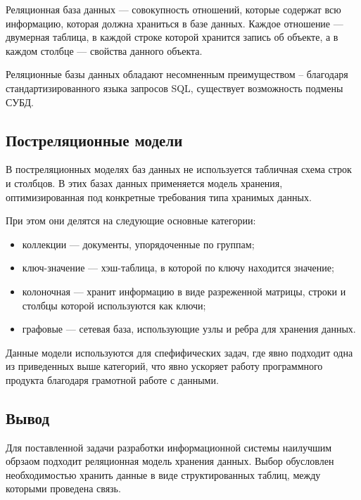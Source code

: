 Реляционная база данных \cite{db-sql} --- совокупность отношений, которые содержат всю информацию, которая должна храниться в базе данных. Каждое отношение --- двумерная таблица, в каждой строке которой хранится запись об объекте, а в каждом столбце --- свойства данного объекта.

Реляционные базы данных обладают несомненным преимуществом -- благодаря стандартизированного языка запросов SQL, существует возможность подмены СУБД.


\subsection{Постреляционные модели}

В постреляционных моделях баз данных \cite{db-nosql} не используется табличная схема строк и столбцов. В этих базах данных применяется модель хранения, оптимизированная под конкретные требования типа хранимых данных.

При этом они делятся на следующие основные категории:

\begin{itemize}
    \item коллекции --- документы, упорядоченные по группам;
    \item ключ-значение --- хэш-таблица, в которой по ключу находится значение;
    \item колоночная --- хранит информацию в виде разреженной матрицы, строки и столбцы которой используются как ключи;
    \item графовые --- сетевая база, использующие узлы и ребра для хранения данных.
\end{itemize}

Данные модели используются для спефифических задач, где явно подходит одна из приведенных выше категорий, что явно ускоряет работу программного продукта благодаря грамотной работе с данными.


\subsection{Вывод}

Для поставленной задачи разработки информационной системы наилучшим обрзаом подходит реляционная модель хранения данных. Выбор обусловлен необходимостью хранить данные в виде структированных таблиц, между которыми проведена связь. 






